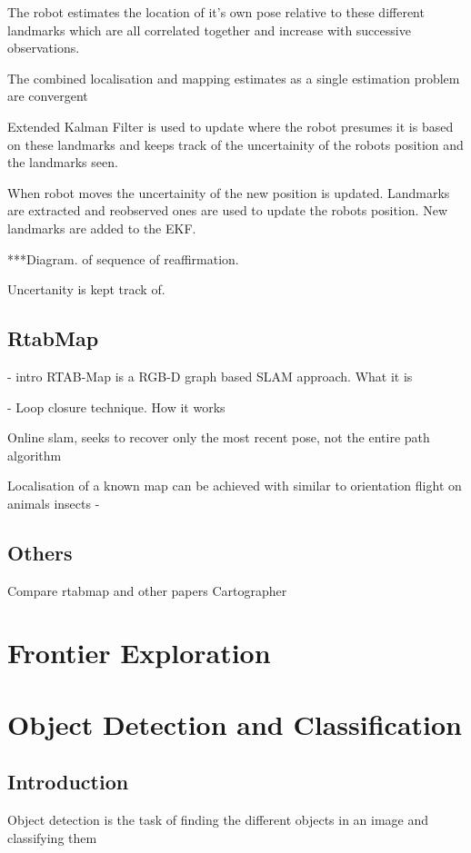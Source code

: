 \documentclass{mproj}
\begin{document}
The robot estimates the location of it's own pose relative to these different landmarks which are all correlated together and increase with successive observations. \cite{Hugh1988}
  
The combined localisation and mapping estimates as a single estimation problem are convergent  
  
  Extended Kalman Filter is used to update where the robot presumes it is based on these landmarks and keeps track of the uncertainity of the robots position and the landmarks seen.
  
  When robot moves the uncertainity of the new position is updated.
  Landmarks are extracted and reobserved ones are used to update the robots position. New landmarks are added to the EKF. 
  
  ***Diagram. of sequence of reaffirmation.


Uncertanity is kept track of.



\subsection{RtabMap}

- intro RTAB-Map is a RGB-D graph based SLAM approach. What it is

- Loop closure technique. How it works

Online slam, seeks to recover only the most recent pose, not the entire path algorithm

Localisation of a known map can be achieved with similar to orientation flight on animals insects -

\subsection{Others}

Compare rtabmap and other papers Cartographer

\section{Frontier Exploration}






\section{Object Detection and Classification}

\subsection{Introduction}
Object detection is the task of finding the different objects in an image and classifying them 
\end{document}
